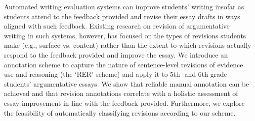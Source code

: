 Automated writing evaluation systems can improve students' writing insofar as students attend to the feedback provided and revise their essay drafts in ways aligned with such feedback. Existing research on revision of argumentative writing in such systems, however, has focused on the types of revisions students make (e.g., surface vs. content) rather than the extent to which revisions actually respond to the feedback provided and improve the essay. We introduce an annotation scheme to capture the nature of sentence-level revisions of evidence use and reasoning (the ‘RER' scheme) and apply it to 5th- and 6th-grade students' argumentative essays. We show that reliable manual annotation can be achieved and that revision annotations correlate with a holistic assessment of essay improvement in line with the feedback provided. Furthermore, we explore the feasibility of automatically classifying revisions according to our scheme.
